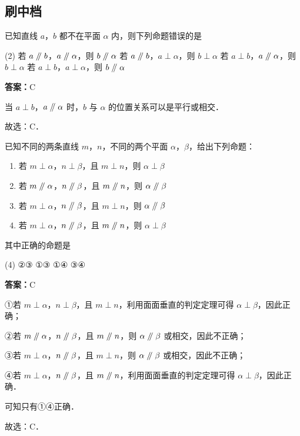 \vspace{2em}

\subsection{刷中档}

\begin{example}[\bkstar{2}{5}]
已知直线 $a$，$b$ 都不在平面 $\alpha$ 内，则下列命题错误的是
\begin{tasks}(2)
    \task 若 $a\mathrel{/\mkern-5mu/} b$，$a\mathrel{/\mkern-5mu/}\alpha$，则 $b\mathrel{/\mkern-5mu/}\alpha$
    \task 若 $a\mathrel{/\mkern-5mu/} b$，$a\perp\alpha$，则 $b\perp\alpha$
    \task 若 $a\perp b$，$a\mathrel{/\mkern-5mu/}\alpha$，则 $b\perp\alpha$
    \task 若 $a\perp b$，$a\perp\alpha$，则 $b\mathrel{/\mkern-5mu/}\alpha$
\end{tasks}
\end{example}
\begin{solution}
\textbf{答案：}C

当 $a\perp b$，$a\mathrel{/\mkern-5mu/}\alpha$ 时，$b$ 与 $\alpha$ 的位置关系可以是平行或相交．

故选：C．
\end{solution}

\vspace{2em}

\begin{example}[\bkstar{2}{5}]
已知不同的两条直线 $m$，$n$，不同的两个平面 $\alpha$，$\beta$，给出下列命题：
\begin{enumerate}
    \item[①] 若 $m\perp\alpha$，$n\perp\beta$，且 $m\perp n$，则 $\alpha\perp\beta$
    \item[②] 若 $m\mathrel{/\mkern-5mu/}\alpha$，$n\mathrel{/\mkern-5mu/}\beta$，且 $m\mathrel{/\mkern-5mu/} n$，则 $\alpha\mathrel{/\mkern-5mu/}\beta$
    \item[③] 若 $m\perp\alpha$，$n\mathrel{/\mkern-5mu/}\beta$，且 $m\perp n$，则 $\alpha\mathrel{/\mkern-5mu/}\beta$
    \item[④] 若 $m\perp\alpha$，$n\mathrel{/\mkern-5mu/}\beta$，且 $m\mathrel{/\mkern-5mu/} n$，则 $\alpha\perp\beta$
\end{enumerate}
其中正确的命题是
\begin{tasks}(4)
    \task ②③
    \task ①③
    \task ①④
    \task ③④
\end{tasks}
\end{example}
\begin{solution}
\textbf{答案：}C

①若 $m\perp\alpha$，$n\perp\beta$，且 $m\perp n$，利用面面垂直的判定定理可得 $\alpha\perp\beta$，因此正确；

②若 $m\mathrel{/\mkern-5mu/}\alpha$，$n\mathrel{/\mkern-5mu/}\beta$，且 $m\mathrel{/\mkern-5mu/} n$，则 $\alpha\mathrel{/\mkern-5mu/}\beta$ 或相交，因此不正确；

③若 $m\perp\alpha$，$n\mathrel{/\mkern-5mu/}\beta$，且 $m\perp n$，则 $\alpha\mathrel{/\mkern-5mu/}\beta$ 或相交，因此不正确；

④若 $m\perp\alpha$，$n\mathrel{/\mkern-5mu/}\beta$，且 $m\mathrel{/\mkern-5mu/} n$，利用面面垂直的判定定理可得 $\alpha\perp\beta$，因此正确．

可知只有①④正确．

故选：C．
\end{solution}

